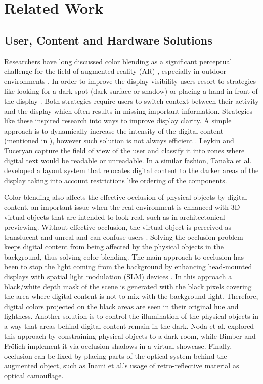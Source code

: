 \documentclass[annual]{acmsiggraph}
\begin{document}
\section{Related Work}
\subsection{User, Content and Hardware Solutions}

Researchers have long discussed color blending as a significant perceptual challenge for the field of augmented reality (AR) \cite{Kruijff:2010}, especially in outdoor environments \cite{Kerr:2011}. In order to improve the display visibility users resort to strategies like looking for a dark spot (dark surface or shadow) or placing a hand in front of the display \cite{Pingel:2005}. Both strategies require users to switch context between their activity and the display which often results in missing important information. Strategies like these inspired research into ways to improve display clarity. A simple approach is to dynamically increase the intensity of the digital content (mentioned in \cite{Kiyokawa:2001}), however such solution is not always efficient \cite{Kerr:2011}. Leykin and Tuceryan  capture the field of view of the user and classify it into zones where digital text would be readable or unreadable. In a similar fashion, Tanaka et al. developed a layout system that relocates digital content to the darker areas of the display taking into account restrictions like ordering of the components.

Color blending also affects the effective occlusion of physical objects by digital content, an important issue when the real environment is enhanced with 3D virtual objects that are intended to look real, such as in architectonical previewing. Without effective occlusion, the virtual object is perceived as translucent and unreal \cite{Cakmakci:2004} and can confuse users \cite{Sekuler:1992}. Solving the occlusion problem keeps digital content from being affected by the physical objects in the background, thus solving color blending. The main approach to occlusion has been to stop the light coming from the background by enhancing head-mounted displays with spatial light modulation (SLM) devices \cite{Cakmakci:2004}\cite{Kiyokawa:2003}\cite{Zhou:2007}. In this approach a black/white depth mask of the scene is generated with the black pixels covering the area where digital content is not to mix with the background light. Therefore, digital colors projected on the black areas are seen in their original hue and lightness. Another solution is to control the illumination of the physical objects in a way that areas behind digital content remain in the dark. Noda et al.  explored this approach by constraining physical objects to a dark room, while Bimber and Fr\H{o}lich  implement it via occlusion shadows in a virtual showcase. Finally, occlusion can be fixed by placing parts of the optical system behind the augmented object, such as Inami et al.'s  usage of retro-reflective material as optical camouflage.
\end{document}
